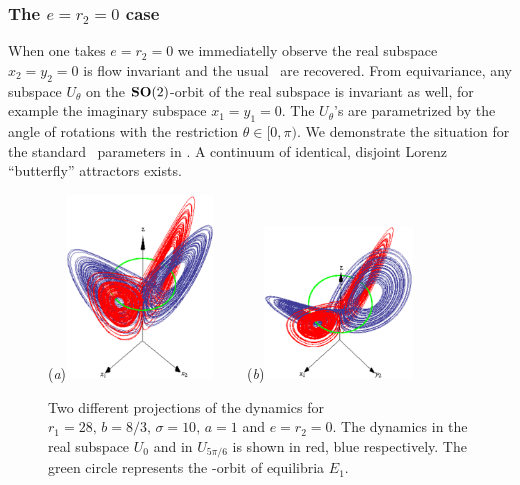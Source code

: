 \subsubsection{The $e=r_2=0$ case}

When one takes $e=r_2=0$ we immediatelly observe the real subspace $x_2=y_2=0$ is flow invariant
and the usual \Le\ are recovered. From equivariance, any subspace $U_\theta$ on the $\mathbf{SO}(2)$-orbit of the real
subspace is invariant as well, for example the imaginary subspace $x_1=y_1=0$. The
$U_\theta$'s are  parametrized by the angle of  rotations with 
the restriction $\theta\in[0,\pi)$. We demonstrate the situation for the standard \Le\ parameters 
in . A continuum of identical, disjoint Lorenz ``butterfly'' attractors exists.

\begin{figure}[t]
\begin{center}
  (\textit{a})\includegraphics[width=0.35\textwidth]{../figs/LorenzCoexA.eps}
~~~~(\textit{b})\includegraphics[width=0.35\textwidth]{../figs/LorenzCoexB.eps}
\end{center}
\caption[Complex Lorenz eq. coexisting attractors]{ Two different projections
of the \CLe dynamics for $r_1=28,\, b=8/3,\, \sigma=10,\, a=1$ and $e=r_2=0$. The dynamics in
the real subspace $U_0$ and in $U_{5\pi/6}$ is shown in red, blue respectively. The green circle
represents the -orbit of equilibria $E_1$.
    }
\label{fig:LorenzCoex}
\end{figure}


